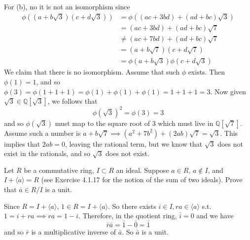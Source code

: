 \begin{solution}
    For (b), no it is not an isomorphism since 
    \begin{align}
      \phi ((a + b \sqrt{3}) (c + d \sqrt{3})) & = \phi ((ac + 3bd) + (ad + bc) \sqrt{3}) \\
                                               & = (ac + 3bd) + (ad + bc) \sqrt{7} \\
                                               & \neq (ac + 7bd) + (ad + bc) \sqrt{7} \\ 
                                               & = (a + b \sqrt{7}) (c + d \sqrt{7}) \\
                                               & = \phi(a + b \sqrt{3}) \phi(c + d  \sqrt{3}) 
    \end{align} 
    We claim that there is no isomorphism. Assume that such $\phi$ exists. Then $\phi(1) = 1$, and so $\phi(3) = \phi(1 + 1 + 1) = \phi(1) + \phi(1) + \phi(1) = 1 + 1 + 1 = 3$. Now given $\sqrt{3} \in \mathbb{Q}[\sqrt{3}]$, we follows that 
    \begin{equation}
      \phi(\sqrt{3})^2 = \phi(3) = 3
    \end{equation}
    and so $\phi(\sqrt{3})$ must map to the square root of $3$ which must live in $\mathbb{Q}[\sqrt{7}]$. Assume such a number is $a + b \sqrt{7} \implies (a^2 + 7b^2) + (2ab) \sqrt{7} = \sqrt{3}$. This implies that $2ab = 0$, leaving the rational term, but we know that $\sqrt{3}$ does not exist in the rationals, and so $\sqrt{3}$ does not exist.  
  \end{solution}

  \begin{exercise}[Shifrin 4.2.12]
    Let $R$ be a commutative ring, $I \subset R$ an ideal. Suppose $a \in R$, $a \notin I$, and $I + \langle a \rangle = R$ (see Exercise 4.1.17 for the notion of the sum of two ideals). Prove that $\bar{a} \in R/I$ is a unit.
  \end{exercise}
  \begin{solution}
    Since $R = I + \langle a \rangle$, $1 \in R = I + \langle a \rangle$. So there exists $i \in I, ra \in \langle a \rangle$ s.t. $1 = i + ra \implies ra = 1 - i$. Therefore, in the quotient ring, $\bar{i} = 0$ and we have 
    \begin{equation}
      \bar{r} \bar{a} = \bar{1} - \bar{0} = \bar{1}
    \end{equation}
    and so $\bar{r}$ is a multiplicative inverse of $\bar{a}$. So $\bar{a}$ is a unit. 
  \end{solution}

